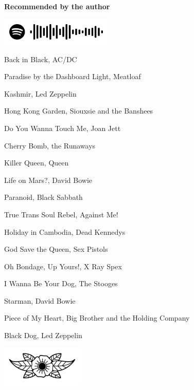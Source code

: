\documentclass[12pt, a5paper, twoside]{book}
\renewcommand{\headrulewidth}{0pt}
\begin{document}
\thispagestyle{empty}
\vspace*{2cm}
\begin{center}
\fontsize{8pt}{8pt}\selectfont

{\bf Recommended by the author}
\vspace*{5mm}

\includegraphics[width=0.4\textwidth]{figures/playlist.png}

\vspace*{4mm}

Back in Black, AC/DC

Paradise by the Dashboard Light, Meatloaf

Kashmir, Led Zeppelin

Hong Kong Garden, Siouxsie and the Banshees

Do You Wanna Touch Me, Joan Jett

Cherry Bomb, the Runaways

Killer Queen, Queen

Life on Mars?, David Bowie

Paranoid, Black Sabbath

True Trans Soul Rebel, Against Me!

Holiday in Cambodia, Dead Kennedys

God Save the Queen, Sex Pistols

Oh Bondage, Up Yours!, X Ray Spex

I Wanna Be Your Dog, The Stooges

Starman, David Bowie

Piece of My Heart, Big Brother and the Holding Company

Black Dog, Led Zeppelin

\end{center}

\newpage



\mainmatter

\pagestyle{fancy}
\renewcommand{\headrulewidth}{0.5pt}





\backmatter

\thispagestyle{empty}
\vspace*{4cm}
\begin{center}

    \includegraphics[width=0.3\textwidth]{figures/divider.png}

\end{center}

\newpage

\thispagestyle{empty}
\mbox{}
\newpage

\thispagestyle{empty}
\mbox{}
\newpage

\end{document}

